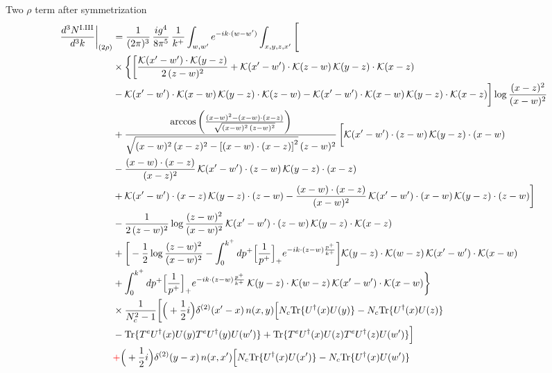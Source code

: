 \documentclass[9pt]{article}
\numberwithin{equation}{section}
\begin{document}
Two $\rho$ term after symmetrization
\begin{align}
\frac{d^{3}N^{\rm I.III}}{d^{3}k}\bigg|_{(2\rho)}&=\frac{1}{(2\pi)^{3}}\,\frac{ig^{4}}{8\pi^{5}}\,\frac{1}{k^{+}}\int_{w,w'}e^{-ik\cdot(w-w')}\int_{x,y,z,x'}\Bigg[\notag\\
&\times\bigg\{\bigg[\frac{\mathcal{K}(x'-w')\cdot\mathcal{K}(y-z)}{2\,(z-w)^{2}}+\mathcal{K}(x'-w')\cdot\mathcal{K}(z-w)\,\mathcal{K}(y-z)\cdot\mathcal{K}(x-z)\notag\\
&-\mathcal{K}(x'-w')\cdot\mathcal{K}(x-w)\,\mathcal{K}(y-z)\cdot\mathcal{K}(z-w)-\mathcal{K}(x'-w')\cdot\mathcal{K}(x-w)\,\mathcal{K}(y-z)\cdot\mathcal{K}(x-z)\bigg]\log\frac{(x-z)^{2}}{(x-w)^{2}}\notag\\
&+\frac{\arccos\left(\frac{(x-w)^{2}-(x-w)\cdot (x-z)}{\sqrt{(x-w)^{2}\,(z-w)^{2}}}\right)}{\sqrt{(x-w)^{2}\,(x-z)^{2}-\left[(x-w)\cdot (x-z)\right]^{2}}\,(z-w)^{2}}\,\bigg[\mathcal{K}(x'-w')\cdot(z-w)\,\mathcal{K}(y-z)\cdot(x-w)\notag\\
&-\frac{(x-w)\cdot(x-z)}{(x-z)^{2}}\,\mathcal{K}(x'-w')\cdot(z-w)\,\mathcal{K}(y-z)\cdot(x-z)\notag\\
&+\mathcal{K}(x'-w')\cdot(x-z)\,\mathcal{K}(y-z)\cdot(z-w)-\frac{(x-w)\cdot(x-z)}{(x-w)^{2}}\,\mathcal{K}(x'-w')\cdot(x-w)\,\mathcal{K}(y-z)\cdot(z-w)\bigg]\notag\\
&-\frac{1}{2\,(z-w)^{2}}\log\frac{(z-w)^{2}}{(x-w)^{2}}\,\mathcal{K}(x'-w')\cdot(z-w)\,\mathcal{K}(y-z)\cdot\mathcal{K}(x-z)\notag\\
&+\bigg[-\frac{1}{2}\log\frac{(z-w)^{2}}{(x-w)^{2}}-\int_{0}^{k^{+}}dp^{+}\Big[\frac{1}{p^{+}}\Big]_{+}e^{-ik\cdot(z-w)\frac{p^{+}}{k^{+}}}\bigg]\mathcal{K}(y-z)\cdot\mathcal{K}(w-z)\,\mathcal{K}(x'-w')\cdot\mathcal{K}(x-w)\notag\\
&+\int_{0}^{k^{+}}dp^{+}\Big[\frac{1}{p^{+}}\Big]_{+}e^{-ik\cdot(z-w)\frac{p^{+}}{k^{+}}}\,\mathcal{K}(y-z)\cdot\mathcal{K}(w-z)\,\mathcal{K}(x'-w')\cdot\mathcal{K}(x-w)\bigg\}\notag\\
&\times \frac{1}{N_{c}^{2}-1}\bigg[\Big(+\frac{1}{2}i\Big)\delta^{(2)}(x'-x)\,n(x,y)\Big[N_{c}{\rm Tr}\{U^{\dagger}(x)U(y)\}-N_{c}{\rm Tr}\{U^{\dagger}(x)U(z)\}\notag\\
& -{\rm Tr}\{T^{e}U^{\dagger}(x)U(y)T^{e}U^{\dagger}(y)U(w')\}+{\rm Tr}\{T^{e}U^{\dagger}(x)U(z)T^{e}U^{\dagger}(z)U(w')\}\Big]\notag\\
& {\color{red}+}\Big(+\frac{1}{2}i\Big)\delta^{(2)}(y-x)\,n(x,x')\Big[N_{c}{\rm Tr}\{U^{\dagger}(x)U(x')\}-N_{c}{\rm Tr}\{U^{\dagger}(x)U(w')\}\notag\\

\end{align}
\end{document}
